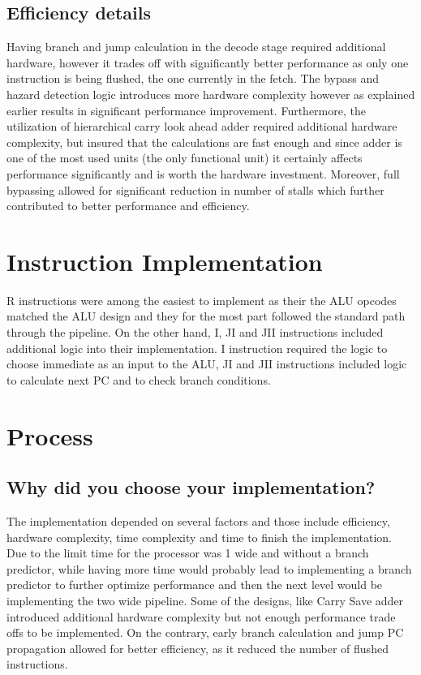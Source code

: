 \documentclass{article}
\begin{document}
\subsection{Efficiency details}
Having branch and jump calculation in the decode stage required additional hardware, however it trades off with significantly better performance as only one instruction is being flushed, the one currently in the fetch. The bypass and hazard detection logic introduces more hardware complexity however as explained earlier results in significant performance improvement. Furthermore, the utilization of hierarchical carry look ahead adder required additional hardware complexity, but insured that the calculations are fast enough and since adder is one of the most used units (the only functional unit) it certainly affects performance significantly and is worth the hardware investment. Moreover, full bypassing allowed for significant reduction in number of stalls which further contributed to better performance and efficiency. \\ 

\section{Instruction Implementation}
R instructions were among the easiest to implement as their the ALU opcodes matched the ALU design and they for the most part followed the standard path through the pipeline. On the other hand, I, JI and JII instructions included additional logic into their implementation. I instruction required the logic to choose immediate as an input to the ALU, JI and JII instructions included logic to calculate next PC and to check branch conditions.

\section{Process}
\subsection{Why did you choose your implementation?}
The implementation depended on several factors and those include efficiency, hardware complexity, time complexity and time to finish the implementation. Due to the limit time for the processor was 1 wide and without a branch predictor, while having more time would probably lead to implementing a branch predictor to further optimize performance and then the next level would be implementing the two wide pipeline. Some of the designs, like Carry Save adder introduced additional hardware complexity but not enough performance trade offs to be implemented. On the contrary, early branch calculation and jump PC propagation allowed for better efficiency, as it reduced the number of flushed instructions.
\end{document}
